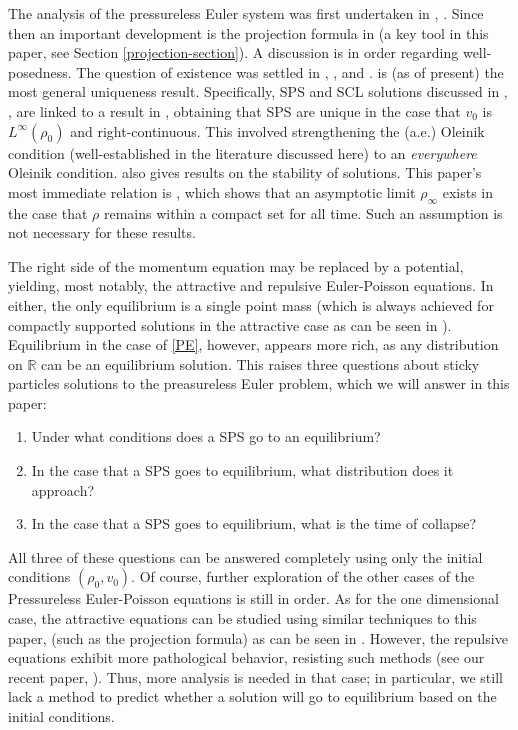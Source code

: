 \documentclass[11pt]{article}
\numberwithin{equation}{section}
\begin{document}
    The analysis of the pressureless Euler system was first undertaken in \cite{ERS}, \cite{BrenGren}. Since then an important development is the projection formula in \cite{Natile-Savare} (a key tool in this paper, see Section \ref{projection-section}). A discussion is in order regarding well-posedness. The question of existence was settled in \cite{Tudorascu-2008}, \cite{Hynd2019}, and \cite{hynd2020trajectorymappressurelesseuler}. \cite{Suder-Tudorascu} is (as of present) the most general uniqueness result. Specifically, SPS and SCL solutions discussed in \cite{BrenGren}, \cite{Tudorascu-2008}, are linked to a result in \cite{Huang-Wang}, obtaining that SPS are unique in the case that $v_0$ is $L^\infty(\rho_0)$ and right-continuous. This involved strengthening the (a.e.) Oleinik condition (well-established in the literature discussed here) to an \textit{everywhere} Oleinik condition. \cite{Natile-Savare} also gives results on the stability of solutions. This paper's most immediate relation is \cite{Hynd-Tudorascu}, which shows that an asymptotic limit $\rho_\infty$ exists in the case that $\rho$ remains within a compact set for all time. Such an assumption is not necessary for these results. 
    
    The right side of the momentum equation may be replaced by a potential, yielding, most notably, the attractive and repulsive Euler-Poisson equations. In either, the only equilibrium is a single point mass (which is always achieved for compactly supported solutions in the attractive case as can be seen in \cite{BLPTW}). Equilibrium in the case of \eqref{PE}, however, appears more rich, as any distribution on $\mathbb{R}$ can be an equilibrium solution. This raises three questions about sticky particles solutions to the preasureless Euler problem, which we will answer in this paper:  
    \begin{enumerate}
        \item Under what conditions does a SPS go to an equilibrium? %
        \item In the case that a SPS goes to equilibrium, what distribution does it approach?  
        \item In the case that a SPS goes to equilibrium, what is the time of collapse? 
    \end{enumerate}
    All three of these questions can be answered completely using only the initial conditions $(\rho_0,v_0)$. Of course, further exploration of the other cases of the Pressureless Euler-Poisson equations is still in order. As for the one dimensional case, the attractive equations can be studied using similar techniques to this paper, (such as the projection formula) as can be seen in \cite{BLPTW}. However, the repulsive equations exhibit more pathological behavior, resisting such methods (see our recent paper, \cite{Repulsive-Paper}). Thus, more analysis is needed in that case; in particular, we still lack a method to predict whether a solution will go to equilibrium based on the initial conditions.
\end{document}
